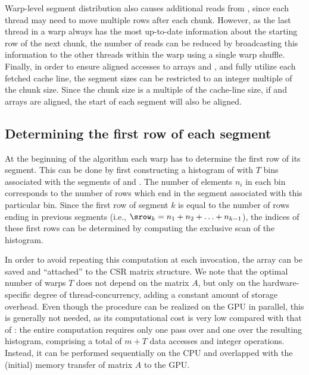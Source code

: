 Warp-level segment distribution also causes
additional reads from \rowptr,
since each thread may need to move multiple rows after each chunk.
However, as the last thread in a warp
always has the most up-to-date information
about the starting row of the next chunk,
the number of reads can be reduced
by broadcasting this information to the other threads within the warp
using a single warp shuffle.
Finally, in order to ensure aligned accesses to arrays \val and \colidx,
and fully utilize each fetched cache line,
the segment sizes can be restricted to an integer multiple of the chunk size.
Since the chunk size is a multiple of the cache-line size,
if \val and \colidx arrays are aligned,
the start of each segment will also be aligned.

\subsection{Determining the first row of each segment}

At the beginning of the \bcsr algorithm each warp has to determine
the first row of its segment.
This can be done by first constructing a histogram of \rowptr
with $T$ bins associated with the segments of \val and \colidx.
The number of elements $n_i$ in each bin corresponds to the number of rows
which end in the segment associated with this particular bin.
Since the first row of segment $k$
is equal to the number of rows ending in previous segments
(i.e., $\srow_k = n_1 + n_2 + \ldots + n_{k-1}$),
the indices of these first rows can be determined by computing the exclusive scan
of the histogram.

In order to avoid repeating this computation at each \spmv invocation,
the array \srow can be saved and ``attached'' to the CSR matrix structure.
We note that the optimal number of warps $T$ does not depend on the matrix $A$,
but only on the hardware-specific degree of thread-concurrency,
adding a constant amount of storage overhead.
Even though the procedure can be realized on the GPU in parallel,
this is generally not needed,
as its computational cost is very low compared with that of \spmv:
the entire computation requires only one pass over
\rowptr and one over the resulting histogram,
comprising a total of $m + T$ data accesses and integer operations.
Instead, it can be performed sequentially on the CPU
and overlapped with the (initial) memory transfer of matrix $A$ to the GPU.

